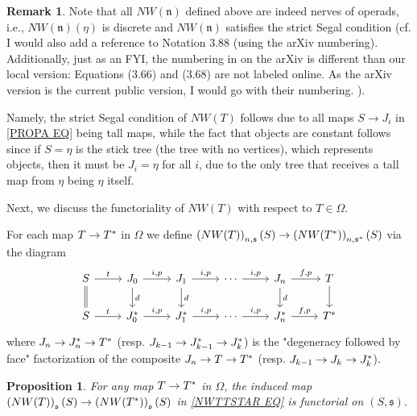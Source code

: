 \documentclass[a4paper,10pt
,draft
]{article}%
\numberwithin{equation}{section}
\numberwithin{figure}{section}
\newtheorem{proposition}[equation]{Proposition}%
\theoremstyle{definition} %
\newtheorem{remark}[equation]{Remark}%
\newcommand{\1}{\ensuremath{\mathbbm 1}}%
\begin{document}
\begin{remark}\label{NWTNS_REM}
	Note that all
	$NW(\mathfrak{n})$ defined above are indeed nerves of operads,
	i.e., 
	$NW(\mathfrak{n})(\eta)$ is discrete
	and
	$NW(\mathfrak{n})$ satisfies the strict Segal condition
	(cf. \cite[Cor 3.77]{BP_geo} 
        {\color{blue} I would also add a reference to Notation 3.88 (using the arXiv numbering).\\
        Additionally, just as an FYI, the numbering in \cite{BP_geo} on the arXiv is different than our local version: Equations (3.66) and (3.68) are not labeled online. As the arXiv version is the current public version, I would go with their numbering.}
        ).

        
{\color{red}

Namely, the strict Segal condition of $NW(T)$ follows due to all maps
$S \to J_i$ in \eqref{PROPA EQ} being tall maps,
while the fact that objects are constant follows since if
$S = \eta$ is the stick tree (the tree with no vertices),
which represents objects, 
then it must be $J_i=\eta$ for all $i$,
due to the only tree that receives a tall map from $\eta$ being $\eta$ itself.
}
\end{remark}



Next, we discuss the functoriality of
$NW(T)$ with respect to $T \in \Omega$.

For each map $T \to T^{\**}$ in $\Omega$
we define
$\left(NW(T)\right)_{n,\mathfrak{s}}(S)
	\to 
\left(NW(T^{\**})\right)_{n,\mathfrak{s}^{\**}}(S)$
via the diagram
\begin{equation}\label{NWTTSTAR EQ}
\begin{tikzcd}
	S \ar{r}{t} \ar[equal]{d}
&
	J_0 \ar{r}{i,p} \ar{d}{d}
&
	J_1 \ar{r}{i,p} \ar{d}{d}
&
	\cdots \ar{r}{i,p}
&
J_n \ar{r}{f,p} \ar{d}{d}
&
	T \ar{d}
\\
	S \ar{r}{t} 
&
	J^{\**}_0 \ar{r}{i,p}
&
	J^{\**}_1 \ar{r}{i,p}
&
	\cdots \ar{r}{i,p}
&
	J^{\**}_n \ar{r}{f,p}
&
	T^{\**}
\end{tikzcd}
\end{equation}
where
$J_n \to J^{\**}_n \to T^{\**}$
(resp. 
$J_{k-1} \to J^{\**}_{k-1} \to J^{\**}_k$)
is the "degeneracy followed by face"
factorization of the composite
$J_n \to T \to T^{\**}$
(resp.
$J_{k-1} \to J_{k} \to J^{\**}_k$).




\begin{proposition}
        \label{NWTNS_NAT_PROP}
	For any map $T \to T^{\**}$ in $\Omega$, the induced map
	$\left(NW(T)\right)_{\mathfrak{s}}(S)
	\to 
	\left(NW(T^{\**})\right)_{\mathfrak{s}}(S)$
	in 
	\eqref{NWTTSTAR EQ}
	is functorial on $(S,\mathfrak{s})$.
\end{proposition}
\end{document}
